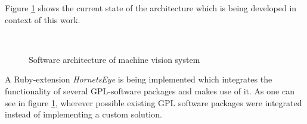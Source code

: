 \documentclass[a4paper,12pt]{book}
\begin{document}
Figure
\ref{fig:architecture} shows the current state of the
architecture which is being developed in context of this work.%
\begin{figure}[htbp]
   \begin{center}
     \\
     \caption{Software architecture of machine vision system\label{fig:architecture}}
   \end{center}
\end{figure}
A Ruby-extension \emph{HornetsEye} is being implemented which integrates
the functionality of several GPL-software packages and makes use of it. As one
can see in figure \ref{fig:architecture}, wherever possible
existing GPL software packages were integrated instead of implementing a custom
solution.
\end{document}
